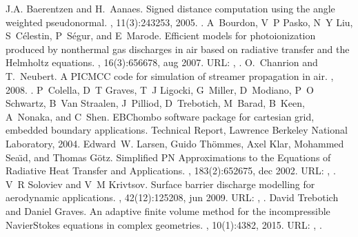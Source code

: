 \documentclass[letterpaper,10pt,english]{sphinxmanual}
\begin{document}
\begin{sphinxthebibliography}{1}
J.A. Baerentzen and H. Aanaes. Signed distance computation using the angle weighted pseudonormal. , 11(3):243\textendash{}253, 2005. .
A Bourdon, V P Pasko, N Y Liu, S Célestin, P Ségur, and E Marode. Efficient models for photoionization produced by non\sphinxhyphen{}thermal gas discharges in air based on radiative transfer and the Helmholtz equations. , 16(3):656\textendash{}678, aug 2007. URL: , .
O. Chanrion and T. Neubert. A PIC\sphinxhyphen{}MCC code for simulation of streamer propagation in air. , 2008. .
P Colella, D T Graves, T J Ligocki, G Miller, D Modiano, P O Schwartz, B Van Straalen, J Pilliod, D Trebotich, M Barad, B Keen, A Nonaka, and C Shen. EBChombo software package for cartesian grid, embedded boundary applications. Technical Report, Lawrence Berkeley National Laboratory, 2004.
Edward W. Larsen, Guido Thömmes, Axel Klar, Mohammed Seaı̈d, and Thomas Götz. Simplified PN Approximations to the Equations of Radiative Heat Transfer and Applications. , 183(2):652\textendash{}675, dec 2002. URL: , .
V R Soloviev and V M Krivtsov. Surface barrier discharge modelling for aerodynamic applications. , 42(12):125208, jun 2009. URL: , .
David Trebotich and Daniel Graves. An adaptive finite volume method for the incompressible Navier\textendash{}Stokes equations in complex geometries. , 10(1):43\textendash{}82, 2015. URL: , .

\end{sphinxthebibliography}
\end{document}
